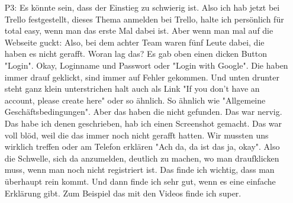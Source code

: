 \begin{itemize}
    \item[P3:] Es k{\"o}nnte sein, dass der Einstieg zu schwierig ist. Also ich hab jetzt bei Trello festgestellt, dieses Thema anmelden bei Trello, halte ich pers{\"o}nlich f{\"u}r total easy, wenn man das erste Mal dabei ist. Aber wenn man mal auf die Webseite guckt: Also, bei dem achter Team waren f{\"u}nf Leute dabei, die haben es nicht gerafft. Woran lag das? Es gab oben einen dicken Button "Login". Okay, Loginname und Passwort oder "Login with Google". Die haben immer drauf geklickt, sind immer auf Fehler gekommen. Und unten drunter steht ganz klein unterstrichen halt auch als Link "If you don't have an account, please create here" oder so {\"a}hnlich. So {\"a}hnlich wie "Allgemeine Gesch{\"a}ftsbedingungen". Aber das haben die nicht gefunden. Das war nervig. Das habe ich denen geschrieben, hab ich einen Screenshot gemacht. Das war voll bl{\"o}d, weil die das immer noch nicht gerafft hatten. Wir mussten uns wirklich treffen oder am Telefon erkl{\"a}ren "Ach da, da ist das ja, okay". Also die Schwelle, sich da anzumelden, deutlich zu machen, wo man draufklicken muss, wenn man noch nicht registriert ist. Das finde ich wichtig, dass man {\"u}berhaupt rein kommt. Und dann finde ich sehr gut, wenn es eine einfache Erkl{\"a}rung gibt. Zum Beispiel das mit den Videos finde ich super.
\end{itemize}

